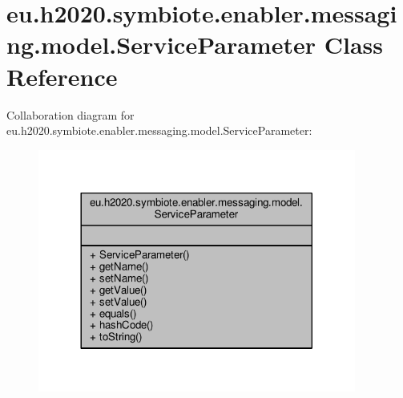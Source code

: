 \hypertarget{classeu_1_1h2020_1_1symbiote_1_1enabler_1_1messaging_1_1model_1_1ServiceParameter}{}\section{eu.\+h2020.\+symbiote.\+enabler.\+messaging.\+model.\+Service\+Parameter Class Reference}
\label{classeu_1_1h2020_1_1symbiote_1_1enabler_1_1messaging_1_1model_1_1ServiceParameter}


Collaboration diagram for eu.\+h2020.\+symbiote.\+enabler.\+messaging.\+model.\+Service\+Parameter\+:\nopagebreak
\begin{figure}[H]
\begin{center}
\leavevmode
\includegraphics[width=296pt]{classeu_1_1h2020_1_1symbiote_1_1enabler_1_1messaging_1_1model_1_1ServiceParameter__coll__graph}
\end{center}
\end{figure}
